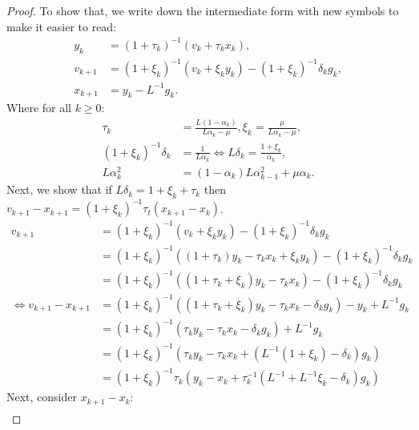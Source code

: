 \documentclass[12pt]{article}
\begin{document}
    \begin{proof}
        To show that, we write down the intermediate form with new symbols to make it easier to read: 
        \begin{align*}
            y_k &= (1 + \tau_k)^{-1}(v_k + \tau_k x_k),
            \\
            v_{k + 1} &= (1 + \xi_k)^{-1}(v_k + \xi_k y_k) - (1 + \xi_k)^{-1}\delta_k g_k,
            \\
            x_{k + 1} &= y_k - L^{-1} g_k. 
        \end{align*} 
        Where for all $k \ge0$: 
        \begin{align*}
            \tau_k &= \frac{L(1 - \alpha_k)}{L\alpha_k - \mu}, 
            \xi_k = \frac{\mu}{L \alpha_k - \mu},
            \\
            (1 + \xi_k)^{-1}\delta_k &= \frac{1}{L\alpha_k}
            \iff L \delta_k = \frac{1 + \xi_k}{\alpha_k}, 
            \\
            L\alpha_k^2 &= (1 - \alpha_k)L\alpha_{k - 1}^2 + \mu\alpha_k. 
        \end{align*}
        Next, we show that if $L\delta_k = 1 + \xi_k + \tau_k$ then $v_{k + 1} - x_{k + 1} = (1 + \xi_k)^{-1}\tau_t(x_{k + 1} - x_k)$. 
        \begin{align*}
            v_{k + 1} &= (1 + \xi_k)^{-1}(v_k + \xi_k y_k) - (1 + \xi_k)^{-1}\delta_k g_k
            \\
            &= 
            (1 + \xi_k)^{-1}((1 + \tau_k)y_k - \tau_k x_k + \xi_k y_k) - (1 + \xi_k)^{-1}\delta_k g_k
            \\
            &= 
            (1 + \xi_k)^{-1}((1 + \tau_k + \xi_k)y_k - \tau_k x_k) - (1 + \xi_k)^{-1}\delta_k g_k
            \\
            \iff 
            v_{k + 1} - x_{k + 1} &= 
            (1 + \xi_k)^{-1}((1 + \tau_k + \xi_k)y_k - \tau_k x_k - \delta_k g_k) - y_k + L^{-1}g_k
            \\
            &= (1 + \xi_k)^{-1}(\tau_k y_k - \tau_k x_k - \delta_k g_k) + L^{-1}g_k
            \\
            &= (1 + \xi_k)^{-1}(\tau_k y_k - \tau_k x_k + (L^{-1}(1 + \xi_k) - \delta_k )g_k)
            \\
            &= (1 + \xi_k)^{-1}\tau_k(y_k - x_k + \tau_k^{-1}(L^{-1} + L^{-1}\xi_k - \delta_k )g_k)
        \end{align*}
        Next, consider $x_{k + 1} - x_{k}$: 
        \begin{align*}

\end{align*}
\end{proof}
\end{document}
